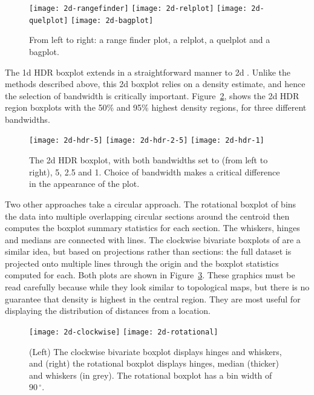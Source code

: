 \documentclass[oneside]{article}
\begin{document}
\begin{figure}[htbp]
  \centering
  \texttt{[image: 2d-rangefinder]}%
  \texttt{[image: 2d-relplot]}%
  \texttt{[image: 2d-quelplot]}%
  \texttt{[image: 2d-bagplot]}
  \caption{From left to right: a range finder plot, a relplot, a quelplot and a bagplot.}
  \label{fig:2d}
\end{figure}

The 1d HDR boxplot extends in a straightforward manner to 2d \citep{hyndman:1996a}. Unlike the methods described above, this 2d boxplot relies on a density estimate, and hence the selection of bandwidth is critically important. Figure~\ref{fig:2d-hdr}, shows the 2d HDR region boxplots with the 50\% and 95\% highest density regions, for three different bandwidths.

\begin{figure}[htbp]
  \centering
  \texttt{[image: 2d-hdr-5]}%
  \texttt{[image: 2d-hdr-2-5]}%
  \texttt{[image: 2d-hdr-1]}
  \caption{The 2d HDR boxplot, with both bandwidths set to (from left to right), 5, 2.5 and 1. Choice of bandwidth makes a critical difference in the appearance of the plot.}
  \label{fig:2d-hdr}
\end{figure}

Two other approaches take a circular approach. The rotational boxplot of \citet{muth:2000} bins the data into multiple overlapping circular sections around the centroid then computes the boxplot summary statistics for each section. The whiskers, hinges and medians are connected with lines. The clockwise bivariate boxplots of \citet{corbellini:2002} are a similar idea, but based on projections rather than sections: the full dataset is projected onto multiple lines through the origin and the boxplot statistics computed for each. Both plots are shown in Figure~\ref{fig:2d-circular}. These graphics must be read carefully because while they look similar to topological maps, but there is no guarantee that density is highest in the central region. They are most useful for displaying the distribution of distances from a location.

\begin{figure}[htbp]
  \centering
  \texttt{[image: 2d-clockwise]}%
  \texttt{[image: 2d-rotational]}%

  \caption{(Left) The clockwise bivariate boxplot displays hinges and whiskers, and (right) the rotational boxplot displays hinges, median (thicker) and whiskers (in grey). The rotational boxplot has a bin width of $90\,^{\circ}$. }

  \label{fig:2d-circular}
\end{figure}
\end{document}
